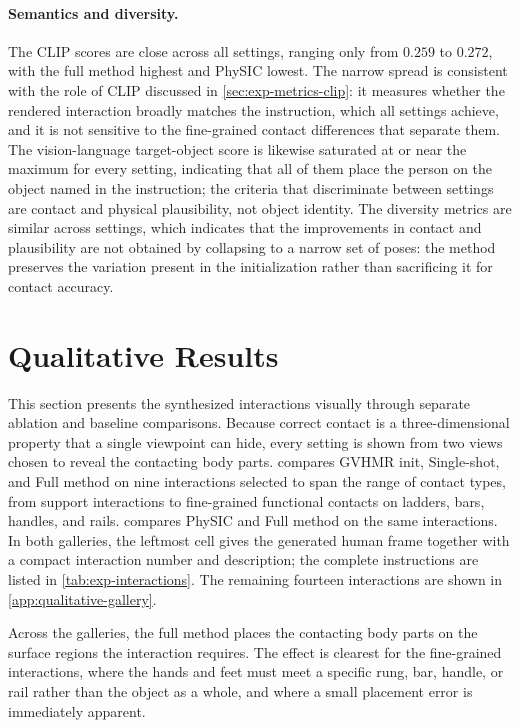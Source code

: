 \paragraph{Semantics and diversity.} The CLIP scores are close across all settings, ranging only from $0.259$ to $0.272$, with the full method highest and PhySIC lowest. The narrow spread is consistent with the role of CLIP discussed in \cref{sec:exp-metrics-clip}: it measures whether the rendered interaction broadly matches the instruction, which all settings achieve, and it is not sensitive to the fine-grained contact differences that separate them. The vision-language target-object score is likewise saturated at or near the maximum for every setting, indicating that all of them place the person on the object named in the instruction; the criteria that discriminate between settings are contact and physical plausibility, not object identity. The diversity metrics are similar across settings, which indicates that the improvements in contact and plausibility are not obtained by collapsing to a narrow set of poses: the method preserves the variation present in the initialization rather than sacrificing it for contact accuracy.


\FloatBarrier
\section{Qualitative Results}
\label{sec:exp-qualitative}

This section presents the synthesized interactions visually through separate ablation and baseline comparisons. Because correct contact is a three-dimensional property that a single viewpoint can hide, every setting is shown from two views chosen to reveal the contacting body parts.  compares GVHMR init, Single-shot, and Full method on nine interactions selected to span the range of contact types, from support interactions to fine-grained functional contacts on ladders, bars, handles, and rails.  compares PhySIC and Full method on the same interactions. In both galleries, the leftmost cell gives the generated human frame together with a compact interaction number and description; the complete instructions are listed in \cref{tab:exp-interactions}. The remaining fourteen interactions are shown in \cref{app:qualitative-gallery}.

Across the galleries, the full method places the contacting body parts on the surface regions the interaction requires. The effect is clearest for the fine-grained interactions, where the hands and feet must meet a specific rung, bar, handle, or rail rather than the object as a whole, and where a small placement error is immediately apparent.

